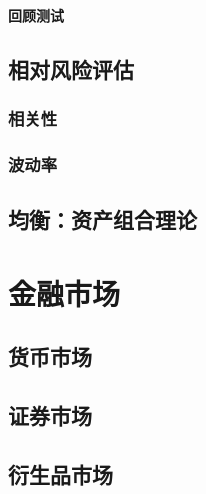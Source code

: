 \documentclass[12pt]{book}
\begin{document}
\subsubsection{回顾测试}


\section{相对风险评估}


\subsection{相关性}



\subsection{波动率}




\section{均衡：资产组合理论}




















\chapter{金融市场}



 

\section{货币市场}




\section{证券市场}




\section{衍生品市场}
\end{document}
